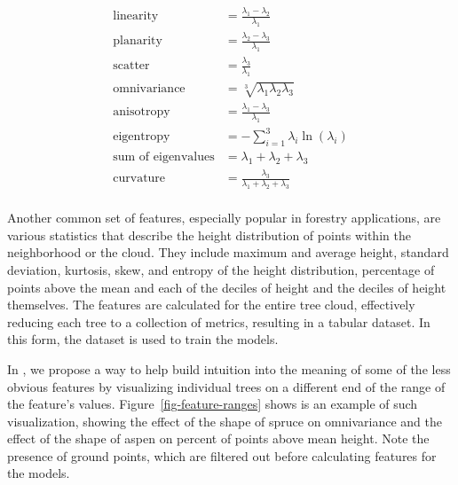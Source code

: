 $$
\begin{aligned}
\text{linearity} &= \frac{\lambda_1 - \lambda_2}{\lambda_1} \\
\text{planarity} &= \frac{\lambda_2 - \lambda_3}{\lambda_1} \\
\text{scatter} &= \frac{\lambda_3}{\lambda_1}  \\
\text{omnivariance} &= \sqrt[3]{\lambda_1\lambda_2\lambda_3} \\
\text{anisotropy} &= \frac{\lambda_1 - \lambda_3}{\lambda_1} \\
\text{eigentropy} &= -\sum_{i=1}^{3} \lambda_i \ln(\lambda_i) \\
\text{sum of eigenvalues} &= \lambda_1 + \lambda_2 + \lambda_3 \\
\text{curvature} &= \frac{\lambda_3}{\lambda_1 + \lambda_2 + \lambda_3} \\
\end{aligned}
$$

Another common set of features, especially popular in forestry applications, are various statistics that describe the height distribution of points within the neighborhood or the cloud.
They include maximum and average height, standard deviation, kurtosis, skew, and entropy of the height distribution, percentage of points above the mean and each of the deciles of height and the deciles of height themselves.
The features are calculated for the entire tree cloud, effectively reducing each tree to a collection of metrics, resulting in a tabular dataset.
In this form, the dataset is used to train the models.

In \citet{dubrovinExplorationPropertiesPoint2024}, we propose a way to help build intuition into the meaning of some of the less obvious features by visualizing individual trees on a different end of the range of the feature's values.
Figure~\ref{fig-feature-ranges} shows is an example of such visualization, showing the effect of the shape of spruce on omnivariance and the effect of the shape of aspen on percent of points above mean height.
Note the presence of ground points, which are filtered out before calculating features for the models.

